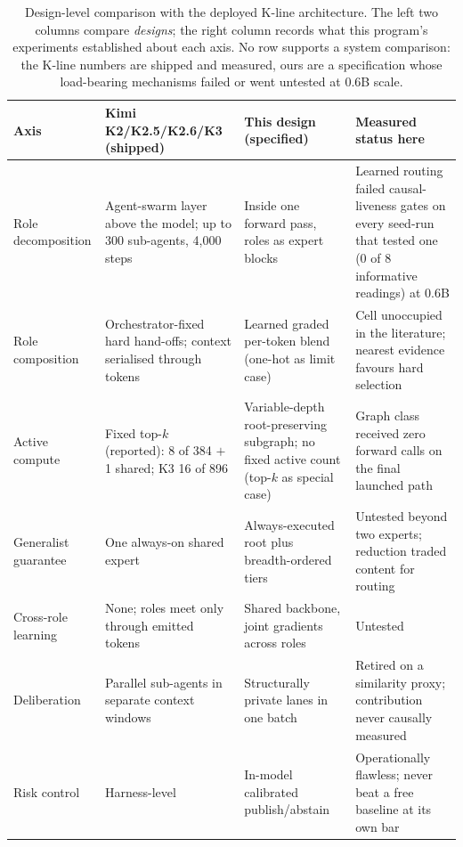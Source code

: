 \documentclass[10pt,a4paper]{article}
\begin{document}
\begin{table}[htbp]
\caption{Design-level comparison with the deployed K-line architecture. The
left two columns compare \emph{designs}; the right column records what this
program's experiments established about each axis. No row supports a system
comparison: the K-line numbers are shipped and measured, ours are a
specification whose load-bearing mechanisms failed or went untested at
0.6B scale.}
\label{tab:design-compare}
\centering\footnotesize
\begin{tabularx}{\textwidth}{@{}>{\raggedright\arraybackslash}p{}>{\raggedright\arraybackslash}p{}>{\raggedright\arraybackslash}p{}>{\raggedright\arraybackslash}X@{}}
\toprule
Axis & Kimi K2/K2.5/K2.6/K3 (shipped) & This design (specified) & Measured status here \\
\midrule
Role decomposition & Agent-swarm layer above the model; up to 300
sub-agents, 4{,}000 steps \cite{marktechpost2026k26} & Inside one forward
pass, roles as expert blocks & Learned routing failed causal-liveness gates
on every seed-run that tested one (0 of 8 informative readings) at 0.6B \\
\addlinespace
Role composition & Orchestrator-fixed hard hand-offs; context serialised
through tokens & Learned graded per-token blend (one-hot as limit case) &
Cell unoccupied in the literature; nearest evidence favours hard selection
\cite{taetz2026continual} \\
\addlinespace
Active compute & Fixed top-$k$ (reported): 8 of 384 $+$ 1 shared; K3 16 of 896
\cite{kimik2report,pandaily2026k3} & Variable-depth root-preserving subgraph;
no fixed active count (top-$k$ as special case) & Graph class received zero
forward calls on the final launched path \\
\addlinespace
Generalist guarantee & One always-on shared expert \cite{kimik2report} &
Always-executed root plus breadth-ordered tiers & Untested beyond two
experts; reduction traded content for routing \\
\addlinespace
Cross-role learning & None; roles meet only through emitted tokens & Shared
backbone, joint gradients across roles & Untested \\
\addlinespace
Deliberation & Parallel sub-agents in separate context windows & Structurally
private lanes in one batch & Retired on a similarity proxy; contribution
never causally measured \\
\addlinespace
Risk control & Harness-level & In-model calibrated publish/abstain
\cite{vovk2005} & Operationally flawless; never beat a free baseline at its
own bar \\
\bottomrule
\end{tabularx}
\end{table}
\end{document}
